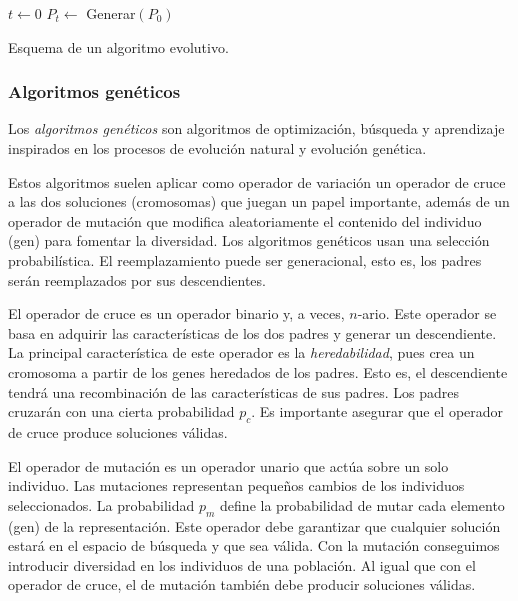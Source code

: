 \begin{Ualgorithm}[H]
    \label{alg:ev}
    \small
    \DontPrintSemicolon
    $t \longleftarrow 0$\;
    $P_t \longleftarrow$ Generar$(P_0)$ 

    \caption{Esquema de un algoritmo evolutivo.}
\end{Ualgorithm}

\subsubsection{Algoritmos genéticos}

Los \emph{algoritmos genéticos} son algoritmos de optimización, búsqueda y aprendizaje inspirados en los procesos de evolución natural y evolución genética.

Estos algoritmos suelen aplicar como operador de variación un operador de cruce a las dos soluciones (cromosomas) que juegan un papel importante, además de un operador de mutación que modifica aleatoriamente el contenido del individuo (gen) para fomentar la diversidad. Los algoritmos genéticos usan una selección probabilística. El reemplazamiento puede ser generacional, esto es, los padres serán reemplazados por sus descendientes.

El operador de cruce es un operador binario y, a veces, $n$-ario. Este operador se basa en adquirir las características de los dos padres y generar un descendiente. La principal característica de este operador es la \emph{heredabilidad}, pues crea un cromosoma a partir de los genes heredados de los padres. Esto es, el descendiente tendrá una recombinación de las características de sus padres. Los padres cruzarán con una cierta probabilidad $p_c$. Es importante asegurar que el operador de cruce produce soluciones válidas.

El operador de mutación es un operador unario que actúa sobre un solo individuo. Las mutaciones representan pequeños cambios de los individuos seleccionados. La probabilidad $p_m$ define la probabilidad de mutar cada elemento (gen) de la representación. Este operador debe garantizar que cualquier solución estará en el espacio de búsqueda y que sea válida. Con la mutación conseguimos introducir diversidad en los individuos de una población. Al igual que con el operador de cruce, el de mutación también debe producir soluciones válidas.

